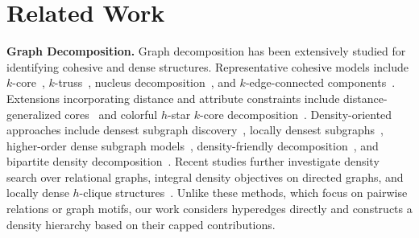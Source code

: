 \documentclass[twocolumn]{svjour3}
\newcommand{\stitle}[1]{\par\noindent\textbf{#1}}
\begin{document}
\section{Related Work}

\stitle{Graph Decomposition.}
Graph decomposition has been extensively studied for identifying cohesive and dense structures. Representative cohesive models include $k$-core~\cite{DBLP:journals/corr/cs-DS-0310049,DBLP:journals/tkde/LiYM14,DBLP:journals/tpds/MontresorPM13}, $k$-truss~\cite{cohen2008trusses,DBLP:journals/pvldb/WangC12,DBLP:conf/sigmod/HuangCQTY14}, nucleus decomposition~\cite{DBLP:conf/www/SariyuceSPC15,DBLP:journals/pvldb/ShiDS21}, and $k$-edge-connected components~\cite{DBLP:conf/sigmod/ChangYQLLL13,DBLP:journals/vldb/ChangW24}. Extensions incorporating distance and attribute constraints include distance-generalized cores~\cite{DBLP:conf/sigmod/BonchiKS19,DBLP:conf/cikm/DaiLQWYZ021} and colorful $h$-star $k$-core decomposition~\cite{DBLP:conf/icde/GaoLQCYW22,DBLP:journals/pvldb/GaoQLH23}.
Density-oriented approaches include densest subgraph discovery~\cite{goldberg1984finding,charikar2000greedy,bahmani2012densest}, locally densest subgraphs~\cite{DBLP:conf/kdd/QinLCZ15,DBLP:journals/tkdd/Tatti19}, higher-order dense subgraph models~\cite{tsourakakis2015k}, density-friendly decomposition~\cite{DBLP:journals/pvldb/ZhangLZQW24}, and bipartite density decomposition~\cite{DBLP:journals/pacmmod/ZhangLZQQW25}. Recent studies further investigate density search over relational graphs, integral density objectives on directed graphs, and locally dense $h$-clique structures~\cite{DBLP:conf/www/Niu0JL25,DBLP:journals/pacmmod/ZhangLLZQW25,DBLP:journals/pvldb/ZhouHF26}. Unlike these methods, which focus on pairwise relations or graph motifs, our work considers hyperedges directly and constructs a density hierarchy based on their capped contributions.
\end{document}
